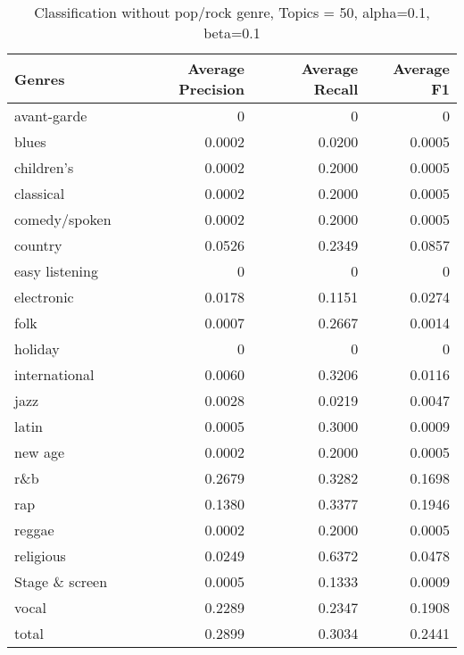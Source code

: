 \begin{table}[h]
\begin{tabular}{|l|r|r|r|}

\hline
\textbf{Genres} &  \textbf{Average Precision} & \textbf{Average Recall} & \textbf{Average F1} \\
\hline
avant-garde & 0 & 	0&	0\\
blues & 0.0002&	0.0200&	0.0005\\
children's & 0.0002&	0.2000	&0.0005\\
classical  & 0.0002	&0.2000&	0.0005\\
comedy/spoken & 0.0002&	0.2000	&0.0005\\
country  & 0.0526&	0.2349&	0.0857\\
easy listening & 0&	0&	0\\
electronic & 0.0178&	0.1151&	0.0274\\
folk & 0.0007&	0.2667	&0.0014\\
holiday & 0&	0&	0\\
international & 0.0060&	0.3206	&0.0116\\
jazz & 0.0028	&0.0219&	0.0047\\
latin & 0.0005&	0.3000&	0.0009\\
new age & 0.0002&	0.2000	&0.0005\\
r\&b & 0.2679&	0.3282&	0.1698\\
rap & 0.1380&	0.3377&	0.1946\\
reggae & 0.0002&	0.2000&	0.0005\\
religious & 0.0249&	0.6372&	0.0478\\
Stage \& screen & 0.0005	&0.1333	&0.0009\\
vocal & 0.2289	&0.2347	&0.1908\\
total& 0.2899 	&0.3034 &	0.2441\\
\hline
\end{tabular}
\caption{Classification without pop/rock genre, Topics = 50, alpha=0.1, beta=0.1}
\end{table}